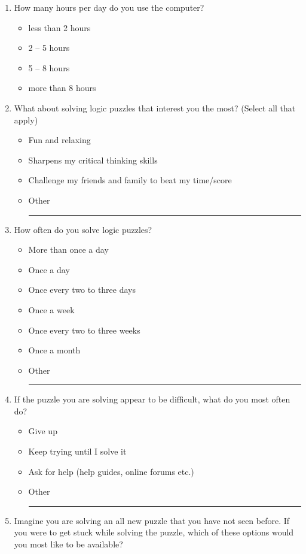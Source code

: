 \documentclass[doctor]{thesis} %
\theoremstyle{plain}
\begin{document}
\begin{enumerate}[topsep=-4em]
\item How many hours per day do you use the computer?
\begin{itemize}[topsep=-6em, label={o}]
\itemsep-1em 
\item less than 2 hours
\item 2 -- 5 hours
\item 5 -- 8 hours
\item more than 8 hours
\end{itemize}
\item What about solving logic puzzles that interest you the most? (Select all that apply)
\begin{itemize}[topsep=-6em, label={o}]
\itemsep-1em 
\item Fun and relaxing
\item Sharpens my critical thinking skills
\item Challenge my friends and family to beat my time/score
\item Other \rule{4cm}{0.4pt}
\end{itemize}
\item How often do you solve logic puzzles?
\begin{itemize}[topsep=-6em, label={o}]
\itemsep-1em 
\item More than once a day
\item Once a day
\item Once every two to three days
\item Once a week
\item Once every two to three weeks
\item Once a month
\item Other \rule{4cm}{0.4pt}
\end{itemize}
\item If the puzzle you are solving appear to be difficult, what do you most often do?
\begin{itemize}[topsep=-6em, label={o}]
\itemsep-1em 
\item Give up
\item Keep trying until I solve it
\item Ask for help (help guides, online forums etc.)
\item Other \rule{4cm}{0.4pt}
\end{itemize}
\item Imagine you are solving an all new puzzle that you have not seen before. If you were to get stuck while solving the puzzle, which of these options would you most like to be available?
\begin{itemize}[topsep=-6em, label={o}]

\end{itemize}
\end{enumerate}
\end{document}
